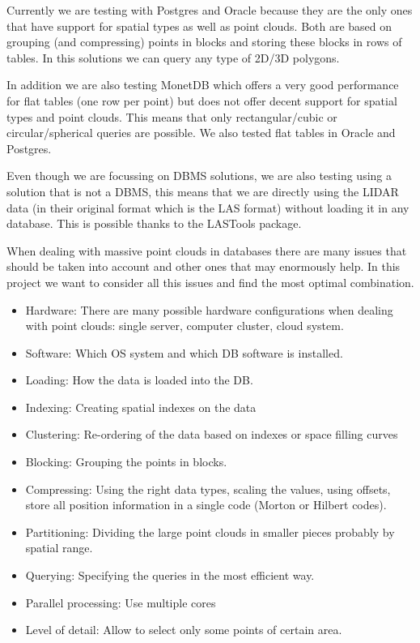 \documentclass[a4paper,11pt]{article}
\begin{document}
Currently we are testing with Postgres and Oracle because they are the only ones that have support for spatial types as well as point clouds. Both are based on grouping (and compressing) points in blocks and storing these blocks in rows of tables. In this solutions we can query any type of 2D/3D polygons.

In addition we are also testing MonetDB which offers a very good performance for flat tables (one row per point) but does not offer decent support for spatial types and point clouds. This means that only rectangular/cubic or circular/spherical queries are possible. We also tested flat tables in Oracle and Postgres.

Even though we are focussing on DBMS solutions, we are also testing using a solution that is not a DBMS, this means that we are directly using the LIDAR data (in their original format which is the LAS format) without loading it in any database. This is possible thanks to the LASTools package.

When dealing with massive point clouds in databases there are many issues that should be taken into account and other ones that may enormously help. In this project we want to consider all this issues and find the most optimal combination.

\begin{itemize}
	\item Hardware: There are many possible hardware configurations when dealing with point clouds: single server, computer cluster, cloud system.
	\item Software: Which OS system and which DB software is installed. 
	\item Loading: How the data is loaded into the DB.
	\item Indexing: Creating spatial indexes on the data
	\item Clustering: Re-ordering of the data based on indexes or space filling curves
	\item Blocking: Grouping the points in blocks.
	\item Compressing: Using the right data types, scaling the values, using offsets, store all position information in a single code (Morton or Hilbert codes).
	\item Partitioning: Dividing the large point clouds in smaller pieces probably by spatial range.
	\item Querying: Specifying the queries in the most efficient way.
	\item Parallel processing: Use multiple cores
	\item Level of detail: Allow to select only some points of certain area.
\end{itemize}
\end{document}
